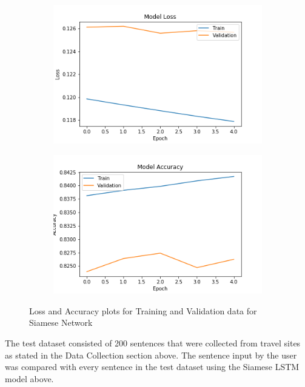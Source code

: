 \documentclass[runningheads]{llncs}
\begin{document}
	\begin{figure}[H]
		\begin{subfigure}[b]{0.51\textwidth}
			\includegraphics[width=\textwidth]{siamese_eng_loss.png}
			\label{fig:Model Loss}
		\end{subfigure}
		\hfill
		\begin{subfigure}[b]{0.51\textwidth}
			\includegraphics[width=\textwidth]{siamese_eng_acc.png}
			\label{fig:Model Accuracy}
		\end{subfigure}
		\caption{Loss and Accuracy plots for Training and Validation data for Siamese Network}
	\end{figure}
	\afterpage{\clearpage}
		

	The test dataset consisted of 200 sentences that were collected from travel sites as stated in the Data Collection section above. The sentence input by the user was compared with every sentence in the test dataset using the Siamese LSTM model above.
	
\end{document}
